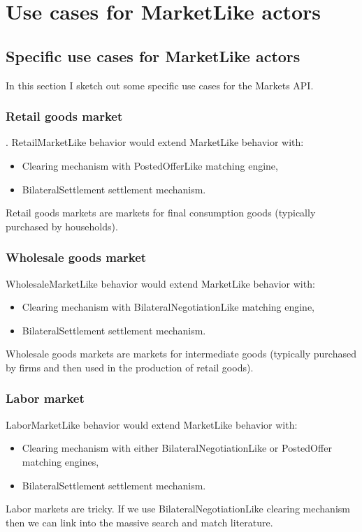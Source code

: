 \documentclass[11pt]{amsart}
\begin{document}
\section{Use cases for MarketLike actors}

\subsection{Specific use cases for MarketLike actors} In this section I sketch out some specific use cases for the Markets API.

\subsubsection{Retail goods market}. RetailMarketLike behavior would extend MarketLike behavior with:
\begin{itemize}
    \item Clearing mechanism with PostedOfferLike matching engine,
    \item BilateralSettlement settlement mechanism.
\end{itemize}
Retail goods markets are markets for final consumption goods (typically purchased by households).

\subsubsection{Wholesale goods market} WholesaleMarketLike behavior would extend MarketLike behavior with:
\begin{itemize}
    \item Clearing mechanism with BilateralNegotiationLike matching engine,
    \item BilateralSettlement settlement mechanism.
\end{itemize}
Wholesale goods markets are markets for intermediate goods (typically purchased by firms and then used in the production of retail goods).

\subsubsection{Labor market} LaborMarketLike behavior would extend MarketLike behavior with:
\begin{itemize}
    \item Clearing mechanism with either BilateralNegotiationLike or PostedOffer matching engines,
    \item BilateralSettlement settlement mechanism.
\end{itemize}
Labor markets are tricky. If we use BilateralNegotiationLike clearing mechanism then we can link into the massive search and match literature.
\end{document}
